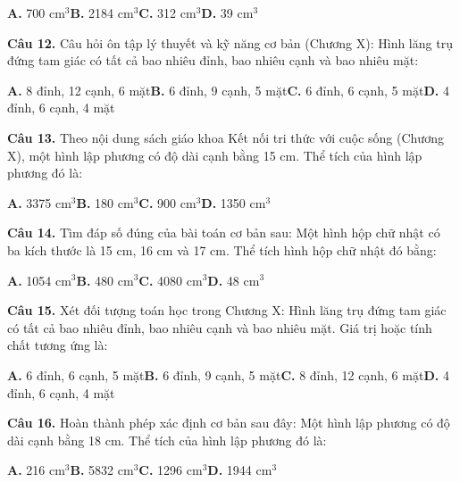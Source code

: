 \documentclass[11pt,a4paper]{article}
\begin{document}
\hspace*{1.5em}\textbf{A.} 700 cm$^3$\quad\quad \textbf{B.} 2184 cm$^3$\quad\quad \textbf{C.} 312 cm$^3$\quad\quad \textbf{D.} 39 cm$^3$\par\vspace{2pt}
\textbf{\color{primary} Câu 12.} Câu hỏi ôn tập lý thuyết và kỹ năng cơ bản (Chương X): Hình lăng trụ đứng tam giác có tất cả bao nhiêu đỉnh, bao nhiêu cạnh và bao nhiêu mặt:\par
\hspace*{1.5em}\textbf{A.} 8 đỉnh, 12 cạnh, 6 mặt\quad\quad \textbf{B.} 6 đỉnh, 9 cạnh, 5 mặt\quad\quad \textbf{C.} 6 đỉnh, 6 cạnh, 5 mặt\quad\quad \textbf{D.} 4 đỉnh, 6 cạnh, 4 mặt\par\vspace{2pt}
\textbf{\color{primary} Câu 13.} Theo nội dung sách giáo khoa Kết nối tri thức với cuộc sống (Chương X), một hình lập phương có độ dài cạnh bằng 15 cm. Thể tích của hình lập phương đó là:\par
\hspace*{1.5em}\textbf{A.} 3375 cm$^3$\quad\quad \textbf{B.} 180 cm$^3$\quad\quad \textbf{C.} 900 cm$^3$\quad\quad \textbf{D.} 1350 cm$^3$\par\vspace{2pt}
\textbf{\color{primary} Câu 14.} Tìm đáp số đúng của bài toán cơ bản sau: Một hình hộp chữ nhật có ba kích thước là 15 cm, 16 cm và 17 cm. Thể tích hình hộp chữ nhật đó bằng:\par
\hspace*{1.5em}\textbf{A.} 1054 cm$^3$\quad\quad \textbf{B.} 480 cm$^3$\quad\quad \textbf{C.} 4080 cm$^3$\quad\quad \textbf{D.} 48 cm$^3$\par\vspace{2pt}
\textbf{\color{primary} Câu 15.} Xét đối tượng toán học trong Chương X: Hình lăng trụ đứng tam giác có tất cả bao nhiêu đỉnh, bao nhiêu cạnh và bao nhiêu mặt. Giá trị hoặc tính chất tương ứng là:\par
\hspace*{1.5em}\textbf{A.} 6 đỉnh, 6 cạnh, 5 mặt\quad\quad \textbf{B.} 6 đỉnh, 9 cạnh, 5 mặt\quad\quad \textbf{C.} 8 đỉnh, 12 cạnh, 6 mặt\quad\quad \textbf{D.} 4 đỉnh, 6 cạnh, 4 mặt\par\vspace{2pt}
\textbf{\color{primary} Câu 16.} Hoàn thành phép xác định cơ bản sau đây: Một hình lập phương có độ dài cạnh bằng 18 cm. Thể tích của hình lập phương đó là:\par
\hspace*{1.5em}\textbf{A.} 216 cm$^3$\quad\quad \textbf{B.} 5832 cm$^3$\quad\quad \textbf{C.} 1296 cm$^3$\quad\quad \textbf{D.} 1944 cm$^3$\par\vspace{2pt}
\end{document}
